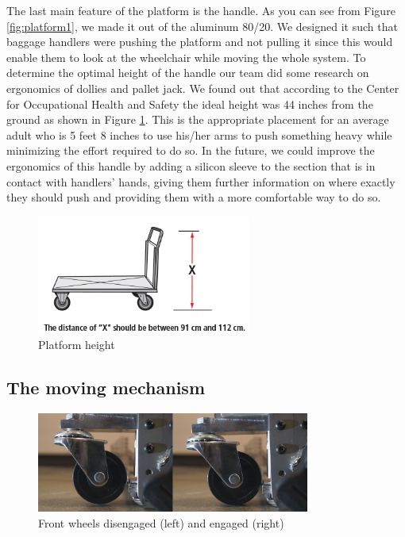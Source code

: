The last main feature of the platform is the handle. As you can see from Figure \ref{fig:platform1}, we made it out of the aluminum 80/20. We designed it such that baggage handlers were pushing the platform and not pulling it since this would enable them to look at the wheelchair while moving the whole system. To determine the optimal height of the handle our team did some research on ergonomics of dollies and pallet jack. We found out that according to the Center for Occupational Health and Safety the ideal height was 44 inches from the ground as shown in Figure \ref{fig:platform4}. This is the appropriate placement for an average adult who is 5 feet 8 inches  to use his/her arms to push something heavy while minimizing the effort required to do so. In the future, we could improve the ergonomics of this handle by adding a silicon sleeve to the section that is in contact with handlers’ hands, giving them further information on where exactly they should push and providing them with a more comfortable way to do so.

\begin{figure}[h]
\centering
\includegraphics[width=7cm]{images/platform4}
\caption{Platform height}
\label{fig:platform4}
\end{figure}

\subsection{The moving mechanism}

\begin{figure}
\centering
 \includegraphics[width=0.8\textwidth]{images/front_wheel}
\caption{Front wheels disengaged (left) and engaged (right)}
\label{fig:front_wheels}
\end{figure}

